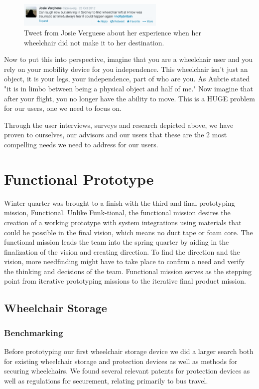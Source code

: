 \begin{figure}[h]
  \centering
     \includegraphics[width=7cm]{images/leftwheelchair.png}
   \caption{Tweet from Josie Verguese about her experience when her wheelchair did not make it to her destination.}
  \label{fig:leftwheelchair.png}
\end{figure}

Now to put this into perspective, imagine that you are a wheelchair user and you rely on your mobility device for you independence. This wheelchair isn't just an object, it is your legs, your independence, part of who are you. As Aubrie stated "it is in limbo between being a physical object and half of me." Now imagine that after your flight, you no longer have the ability to move. This is a HUGE problem for our users, one we need to focus on. 


 Through  the user interviews, surveys and research depicted above, we have proven to ourselves, our advisors and our users that these are the 2 most compelling needs we need to address for our users. 


\section{Functional Prototype}
Winter quarter was brought to a finish with the third and final prototyping mission, Functional.  Unlike Funk-tional, the functional mission desires the creation of a working prototype with system integrations using materials that could be possible in the final vision, which means no duct tape or foam core. The functional mission leads the team into the spring quarter by aiding in the finalization of the vision and creating direction.  To find the direction and the vision, more needfinding might have to take place to confirm a need and verify the thinking and decisions of the team. Functional mission serves as the stepping point from iterative prototyping missions to the iterative final product mission.

\subsection{Wheelchair Storage}

\subsubsection{Benchmarking}
Before prototyping our first wheelchair storage device we did a larger search both for existing wheelchair storage and protection devices as well as methods for securing wheelchairs. We found several relevant patents for protection devices as well as regulations for securement, relating primarily to bus travel.

